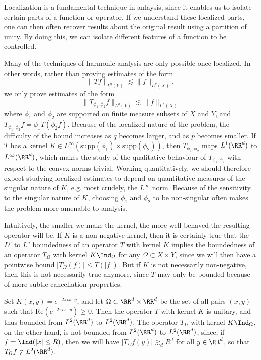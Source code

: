 Localization is a fundamental technique in anlaysis, since it enables us to isolate certain parts of a function or operator. If we understand these localized parts, one can then often recover results about the original result using a partition of unity. By doing this, we can isolate different features of a function to be controlled.

Many of the techniques of harmonic analysis are only possible once localized. In other words, rather than proving estimates of the form
%
\[ \| Tf \|_{L^q(Y)} \lesssim \| f \|_{L^p(X)}, \]
%
we only prove estimates of the form
%
\[ \| T_{\phi_1, \phi_2} f \|_{L^q(Y)} \lesssim \| f \|_{L^p(X)} \]
%
where $\phi_1$ and $\phi_2$ are supported on finite measure subsets of $X$ and $Y$, and $T_{\phi_1, \phi_2} f = \phi_1 T(\phi_2 f)$. Because of the localized nature of the problem, the difficulty of the bound increases as $q$ becomes larger, and as $p$ becomes smaller. If $T$ has a kernel $K \in L^\infty(\text{supp}(\phi_1) \times \text{supp}(\phi_2))$, then $T_{\phi_1, \phi_2}$ maps $L^1(\RR^d)$ to $L^\infty(\RR^d)$, which makes the study of the qualitative behaviour of $T_{\phi_1, \phi_2}$ with respect to the convex norms trivial. Working quantitatively, we should therefore expect studying localized estimates to depend on quantitative measures of the singular nature of $K$, e.g. most crudely, the $L^\infty$ norm. Because of the sensitivity to the singular nature of $K$, choosing $\phi_1$ and $\phi_2$ to be non-singular often makes the problem more amenable to analysis.

Intuitively, the smaller we make the kernel, the more well behaved the resulting operator will be. If $K$ is a non-negative kernel, then it is certainly true that the $L^p$ to $L^q$ boundedness of an operator $T$ with kernel $K$ implies the boundedness of an operator $T_\Omega$ with kernel $K \Ind_\Omega$ for any $\Omega \subset X \times Y$, since we will then have a pointwise bound $|T_\Omega(f)| \leq T(|f|)$. But if $K$ is not necessarily non-negative, then this is not necessarily true anymore, since $T$ may only be bounded because of more subtle cancellation properties.

\begin{example}
    Set $K(x,y) = e^{-2 \pi i x \cdot y}$, and let $\Omega \subset \RR^d \times \RR^d$ be the set of all pairs $(x,y)$ such that $\text{Re}(e^{- 2 \pi i x \cdot y}) \geq 0$. Then the operator $T$ with kernel $K$ is unitary, and thus bounded from $L^2(\RR^d)$ to $L^2(\RR^d)$. The operator $T_\Omega$ with kernel $K \Ind_\Omega$, on the other hand, is not bounded from $L^2(\RR^d)$ to $L^2(\RR^d)$, since, if $f = \Ind(|x| \leq R)$, then we will have $|T_\Omega f(y)| \gtrsim_d R^d$ for all $y \in \RR^d$, so that $T_\Omega f \not \in L^2(\RR^d)$.
\end{example}

